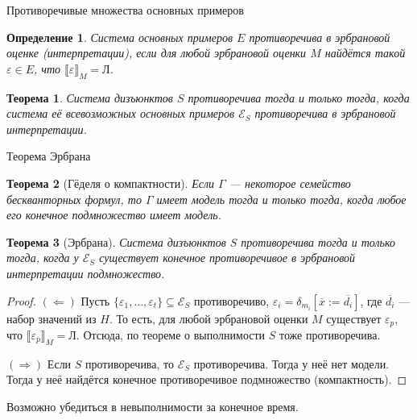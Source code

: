 \documentclass[aspectratio=169]{beamer}
\newtheorem{thm}{Теорема}[section]
\newtheorem{dfn}{Определение}[section]
\begin{document}
\begin{frame}{Противоречивые множества основных примеров}
\begin{dfn}Система основных примеров $E$ противоречива в эрбрановой оценке (интерпретации), если 
для любой эрбрановой оценки $M$ найдётся такой $\varepsilon\in E$, что $\llbracket \varepsilon \rrbracket_M = \text{Л}$.
\end{dfn}

\begin{thm}Система дизъюнктов $S$ противоречива тогда и только тогда, когда система её всевозможных
основных примеров $\mathcal{E}_S$ противоречива в эрбрановой интерпретации.\end{thm}
\end{frame}

\begin{frame}{Теорема Эрбрана}
\begin{thm}[Гёделя о компактности]Если $\Gamma$ --- некоторое семейство бескванторных формул, то $\Gamma$ имеет модель
тогда и только тогда, когда любое его конечное подмножество имеет модель.\end{thm}

\begin{thm}[Эрбрана]Система дизъюнктов $S$ противоречива тогда и только тогда, когда у
$\mathcal{E}_S$ существует конечное противоречивое в эрбрановой интерпретации подмножество.\end{thm}
\begin{proof}$(\Leftarrow)$ 
Пусть $\{\varepsilon_1,\dots,\varepsilon_t\} \subseteq \mathcal{E}_S$ противоречиво, $\varepsilon_i = \delta_{m_i}[\overline{x} := \overline{d_i}]$,
где $\overline{d_i}$ --- набор значений из $H$. 
То есть, для любой эрбрановой оценки $M$ существует $\varepsilon_p$, что $\llbracket\varepsilon_p\rrbracket_M = \text{Л}$. 
Отсюда, по теореме о выполнимости $S$ тоже противоречива.

$(\Rightarrow)$ Если $S$ противоречива, то $\mathcal{E}_S$ противоречива. 
Тогда у неё нет модели. Тогда у неё найдётся конечное противоречивое подмножество (компактность).
\end{proof}

Возможно убедиться в невыполнимости за конечное время.
\end{frame}
\end{document}
